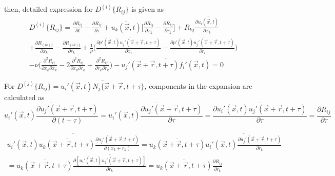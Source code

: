 \documentclass[paper=a4, fontsize=11pt]{scrartcl} %
\numberwithin{equation}{section} %
\numberwithin{figure}{section} %
\numberwithin{table}{section} %
\begin{document}
	then, detailed expression for  $D^{(i)}\{R_{ij}\}$ is given as
	\begin{equation}
		\begin{aligned}
			D^{(i)}\{R_{ij}\} = \frac{\partial R_{ij}}{\partial t} - \frac{\partial R_{ij}}{\partial \tau} + \overline{u_k(\vec{x}, t)} \Bigg[\frac{\partial R_{ij}}{\partial x_k}- \frac{\partial R_{ij}}{\partial r_k}\Bigg] + R_{kj}\frac{\partial \overline{u_i(\vec{x}, t)}}{\partial x_k} \\ + \frac{\partial R_{(ik)j}}{\partial x_k} - \frac{\partial R_{(ik)j}}{\partial r_k} + \frac{1}{\rho} \Bigg(\frac{\partial \overline{p'(\vec{x}, t) u_j'(\vec{x} + \vec{r}, t+\tau)}}{\partial x_i} - \frac{\partial \overline{p'(\vec{x}, t) u_j'(\vec{x} + \vec{r}, t+\tau)}}{\partial r_i}\Bigg) \\ - \nu \Bigg(\frac{\partial^2 R_{ij}}{\partial x_k \partial x_k} - 2\frac{\partial^2 R_{ij}}{\partial x_k \partial r_k} + \frac{\partial^2 R_{ij}}{\partial r_k \partial r_k}\Bigg) - \overline{u_j'(\vec{x} + \vec{r}, t+\tau) f_i'(\vec{x}, t)} = 0
		\end{aligned}
	\end{equation}
	
	 For $D^{(j)}\{R_{ij}\} = \overline{u_i'(\vec{x}, t) N_j\{\vec{x} + \vec{r}, t + \tau\}}$, components in the expansion are calculated as
	 \begin{equation}
	 	\overline{u_i'(\vec{x}, t) \frac{\partial u_j'(\vec{x} + \vec{r}, t + \tau)}{\partial (t + \tau)}} = \overline{u_i'(\vec{x}, t) \frac{\partial u_j'(\vec{x} + \vec{r}, t + \tau)}{\partial \tau}} = \overline{ \frac{\partial u_i'(\vec{x}, t) u_j'(\vec{x} + \vec{r}, t + \tau)}{\partial \tau}} = \frac{\partial R_{ij}}{\partial \tau}
	 \end{equation}
	 
	 \begin{equation}
	 	\begin{aligned}
	 		\overline{u_i'(\vec{x}, t) \overline{u_k(\vec{x} + \vec{r}, t + \tau)}\frac{\partial u_j'(\vec{x} + \vec{r}, t + \tau)}{\partial (x_k + r_k)}} 
	 		 = \overline{u_k(\vec{x} + \vec{r}, t + \tau)} \overline{u_i'(\vec{x}, t) \frac{\partial u_j'(\vec{x} + \vec{r}, t + \tau)}{\partial r_k}}\\
	 		 = \overline{u_k(\vec{x} + \vec{r}, t + \tau)} \overline{\frac{\partial [u_i'(\vec{x}, t)u_j'(\vec{x} + \vec{r}, t + \tau)]}{\partial r_k}} = \overline{u_k(\vec{x} + \vec{r}, t + \tau)} \frac{\partial R_{ij}}{\partial r_k}
	 	\end{aligned}
	 \end{equation}
	 
\end{document}
